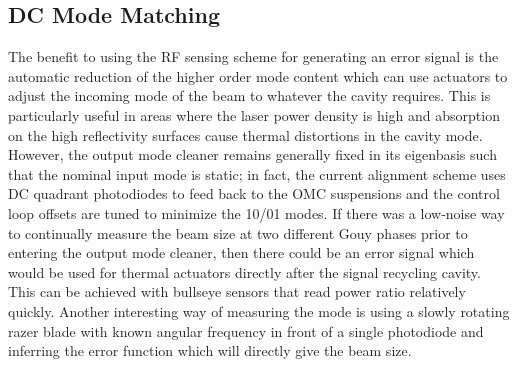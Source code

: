 \subsection{DC Mode Matching}
	The benefit to using the RF sensing scheme for generating an error signal is the automatic reduction of the higher order mode content which can use actuators to adjust the incoming mode of the beam to whatever the cavity requires.
	This is particularly useful in areas where the laser power density is high and absorption on the high reflectivity surfaces cause thermal distortions in the cavity mode.
	However, the output mode cleaner remains generally fixed in its eigenbasis such that the nominal input mode is static; in fact, the current alignment scheme uses DC quadrant photodiodes to feed back to the OMC suspensions and the control loop offsets are tuned to minimize the 10/01 modes.
	If there was a low-noise way to continually measure the beam size at two different Gouy phases prior to entering the output mode cleaner, then there could be an error signal which would be used for thermal actuators directly after the signal recycling cavity.
	This can be achieved with bullseye sensors that read power ratio relatively quickly.
	Another interesting way of measuring the mode is using a slowly rotating razer blade with known angular frequency in front of a single photodiode and inferring the error function which will directly give the beam size.
	